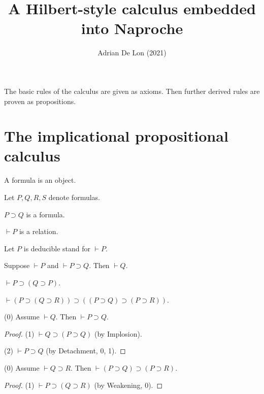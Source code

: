 \documentclass{article}
\title{A Hilbert-style calculus embedded into Naproche}
\author{Adrian De Lon (2021)}
\date{}
\newcommand{\imp}{\supset}
\newcommand{\deducible}{\vdash}
\begin{document}

\maketitle

The basic rules of the calculus are given as axioms.
Then further derived rules are proven as propositions.

\section{The implicational propositional calculus}

\begin{forthel}

\begin{signature}
    A formula is an object.
\end{signature}
Let $P, Q, R, S$ denote formulas.

\begin{signature}
    $P \imp Q$ is a formula.
\end{signature}

\begin{signature}
    $\deducible P$ is a relation.
\end{signature}
Let $P$ is deducible stand for $\deducible P$.

\begin{axiom}[Detachment]
    Suppose $\deducible P$ and $\deducible P \imp Q$.
    Then $\deducible Q$.
\end{axiom}

\begin{axiom}[Implosion]
    $\deducible P \imp (Q \imp P)$.
\end{axiom}

\begin{axiom}[Chain]
    $\deducible (P \imp (Q \imp R)) \imp ((P \imp Q) \imp (P \imp R))$.
\end{axiom}

\begin{proposition}[Weakening]
    (0) Assume $\deducible Q$.
    Then $\deducible P\imp Q$.
\end{proposition}
\begin{proof}
    (1) $\deducible Q\imp (P\imp Q)$ (by Implosion).

    (2) $\deducible P\imp Q$ (by Detachment, 0, 1).
\end{proof}

\begin{proposition}
    (0) Assume $\deducible Q\imp R$.
    Then $\deducible (P\imp Q)\imp (P \imp R)$.
\end{proposition}
\begin{proof}
    (1) $\deducible P\imp (Q\imp R)$ (by Weakening, 0).


\end{proof}
\end{forthel}
\end{document}
